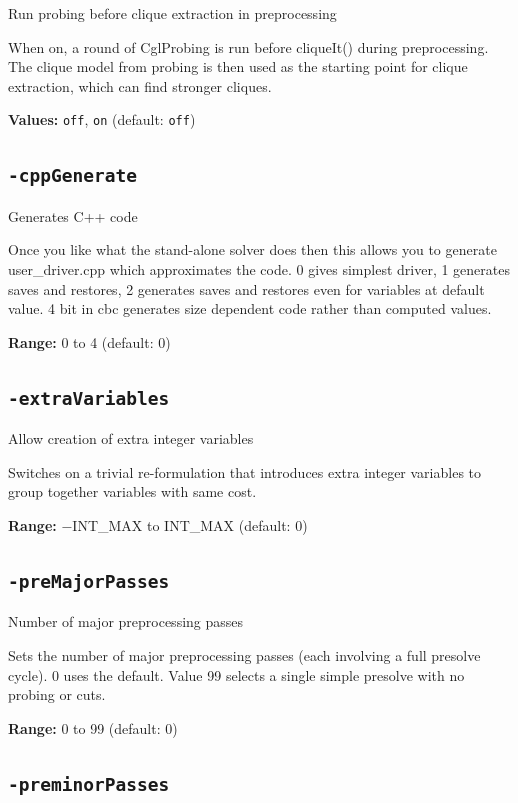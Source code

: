 \documentclass[11pt,a4paper]{article}
\begin{document}
Run probing before clique extraction in preprocessing

When on, a round of CglProbing is run before cliqueIt() during preprocessing. The clique model from probing is then used as the starting point for clique extraction, which can find stronger cliques.

\textbf{Values:} \texttt{off}, \texttt{on} (default: \texttt{off})

\subsection*{\texttt{-cppGenerate}}

Generates C++ code

Once you like what the stand-alone solver does then this allows you to generate user\_driver.cpp which approximates the code.  0 gives simplest driver, 1 generates saves and restores, 2 generates saves and restores even for variables at default value. 4 bit in cbc generates size dependent code rather than computed values.

\textbf{Range:} 0 to 4 (default: 0)

\subsection*{\texttt{-extraVariables}}

Allow creation of extra integer variables

Switches on a trivial re-formulation that introduces extra integer variables to group together variables with same cost.

\textbf{Range:} $-$INT\_MAX to INT\_MAX (default: 0)

\subsection*{\texttt{-preMajorPasses}}

Number of major preprocessing passes

Sets the number of major preprocessing passes (each involving a full presolve cycle). 0 uses the default. Value 99 selects a single simple presolve with no probing or cuts.

\textbf{Range:} 0 to 99 (default: 0)

\subsection*{\texttt{-preminorPasses}}
\end{document}
